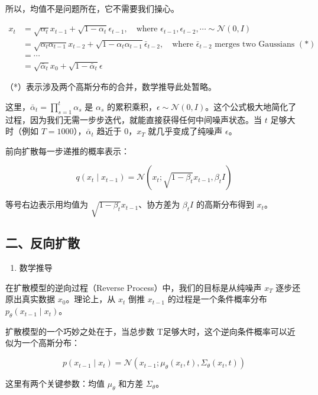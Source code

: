 所以，均值不是问题所在，它不需要我们操心。

\[
\begin{aligned}
x_t
&= \sqrt{\alpha_t}x_{t-1} + \sqrt{1-\alpha_t}\epsilon_{t-1},
\quad \text{where } \epsilon_{t-1},\epsilon_{t-2},\cdots \sim \mathcal{N}(0,I) \\
&= \sqrt{\alpha_t\alpha_{t-1}}x_{t-2}
 + \sqrt{1-\alpha_t\alpha_{t-1}}\bar{\epsilon}_{t-2},
\quad \text{where } \bar{\epsilon}_{t-2} \text{ merges two Gaussians } (*) \\
&= \cdots \\
&= \sqrt{\bar{\alpha}_t}x_0+\sqrt{1-\bar{\alpha}_t}\epsilon
\end{aligned}
\]

（*）表示涉及两个高斯分布的合并，数学推导此处暂略。

这里，\(\bar{\alpha}_t=\prod_{s=1}^{t}\alpha_s\) 是 \(\alpha_s\) 的累积乘积，\(\epsilon\sim\mathcal{N}(0,I)\)。这个公式极大地简化了过程，因为我们无需一步步迭代，就能直接获得任何中间噪声状态。当 \(t\) 足够大时（例如 \(T=1000\)），\(\bar{\alpha}_t\) 趋近于 \(0\)，\(x_T\) 就几乎变成了纯噪声 \(\epsilon\)。

前向扩散每一步递推的概率表示：

\[
q(x_t\mid x_{t-1}) = \mathcal{N}(x_t;\sqrt{1-\beta_t}x_{t-1},\beta_t I)
\]

等号右边表示用均值为 \(\sqrt{1-\beta_t}x_{t-1}\)、协方差为 \(\beta_t I\) 的高斯分布得到 \(x_t\)。

\hypertarget{ux4e8cux53cdux5411ux6269ux6563}{%
\subsection{二、反向扩散}\label{ux4e8cux53cdux5411ux6269ux6563}}

\begin{enumerate}
\def\labelenumi{\arabic{enumi}.}
\tightlist
\item
  数学推导
\end{enumerate}

在扩散模型的逆向过程（Reverse Process）中，我们的目标是从纯噪声 \(x_T\) 逐步还原出真实数据 \(x_0\)。理论上，从 \(x_t\) 倒推 \(x_{t-1}\) 的过程是一个条件概率分布 \(p_\theta(x_{t-1}\mid x_t)\)。

扩散模型的一个巧妙之处在于，当总步数 T足够大时，这个逆向条件概率可以近似为一个高斯分布：

\[
p(x_{t-1}\mid x_t)=\mathcal{N}(x_{t-1};\mu_\theta(x_t,t),\Sigma_\theta(x_t,t))
\]

这里有两个关键参数：均值 \(\mu_\theta\) 和方差 \(\Sigma_\theta\)。

